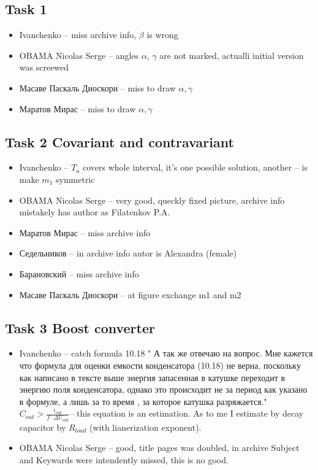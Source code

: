 \documentclass[a4paper,landscape,11pt]{article}
\begin{document}
\subsection{Task 1}
\begin{itemize}
\item Ivanchenko -- miss archive info, $\beta$ is wrong
\item OBAMA Nicolas Serge -- angles $\alpha$, $\gamma$ are not marked, actualli initial version was screewed
\item Масаве Паскаль Диоскори -- miss to draw $\alpha,\gamma$
\item Маратов Мирас  -- miss to draw $\alpha,\gamma$ 
\end{itemize}

\subsection{Task 2 Covariant and contravariant}
\begin{itemize}
\item Ivanchenko -- $T_a$ covers whole interval, it's one possible solution, another -- is make $m_1$ symmetric
\item OBAMA Nicolas Serge -- very good, queckly fixed picture, archive info mistakely has author as Filatenkov P.A.
\item Маратов Мирас  --  miss archive info
\item Седельников -- in archive info autor is Alexandra (female)
\item Барановский  --  miss archive info
\item Масаве Паскаль Диоскори -- at figure exchange m1 and m2
\end{itemize}

\subsection{Task 3 Boost converter}
\begin{itemize}
\item Ivanchenko -- catch formula 10.18 
" А так же отвечаю на вопрос. Мне кажется что формула для оценки емкости конденсатора (10.18) не верна, поскольку как написано в тексте выше энергия запасенная в катушке переходит в энергию поля конденсатора, однако это происходит не за период как указано в формуле, а лишь за то время , за которое катушка разряжается." 
$C_{out}> \frac{i_{out}}{f\cdot \Delta U_{out}}$-- this equation is an estimation.
As to me I estimate by decay capacitor by $R_{load}$ (with lianerization exponent).

\item OBAMA Nicolas Serge -- good, title pages was doubled, in archive Subject and Keywards were intendently missed, this is no good. 
\end{itemize}
\end{document}
